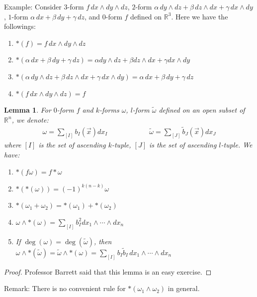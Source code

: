 \documentclass[15pt]{book}
\theoremstyle{break}
\theoremstyle{break}
\newtheorem{lem}{Lemma}[thm]
\newcommand{\R}{\mathbb{R}}
\newcommand{\that}[1]{\widetilde{#1}}
\newcommand{\remark}{\color{blue}Remark: \color{black}}
\newcommand{\example}{\color{green}Example: \color{black}}
\begin{document}
\example
Consider $3$-form $f\, dx\wedge dy \wedge dz$, $2$-form $\alpha\, dy \wedge dz + \beta\, dz \wedge dx + \gamma\, dx \wedge dy$, $1$-form $\alpha \, dx + \beta \, dy + \gamma \, dz$, and $0$-form $f$ defined on $\R^3$. Here we have the followings:
\begin{enumerate}[topsep=3pt,itemsep=-1ex,partopsep=1ex,parsep=1ex]
\item $*(f) = f\, dx \wedge dy \wedge dz$ 
\item $*(\alpha \, dx + \beta \, dy + \gamma \, dz) = \alpha dy \wedge dz + \beta dz \wedge dx + \gamma dx \wedge dy$
\item $*(\alpha\, dy \wedge dz + \beta\, dz \wedge dx + \gamma\, dx \wedge dy) = \alpha\, dx + \beta \, dy + \gamma \, dz$
\item $*(f\, dx\wedge dy \wedge dz) = f$
\end{enumerate}


\begin{lem}
For $0$-form $f$ and $k$-forms $\omega$, $l$-form $\that{\omega}$ defined on an open subset of $\R^n$, we denote:
\begin{align*}
\omega = \sum_{[I]} b_I(\vec{x}) dx_I \qquad\qquad\qquad\that{\omega} =\sum_{[J]} \that{b}_J(\vec{x}) dx_J
\end{align*}
where $[I]$ is the set of ascending $k$-tuple, $[J]$ is the set of ascending $l$-tuple. We have: 
\begin{enumerate}[topsep=3pt,itemsep=-1ex,partopsep=1ex,parsep=1ex]
\item $*(f\omega) = f*\omega$
\item $*(*(\omega)) = (-1)^{k(n-k)}\omega$
\item $*(\omega_1 + \omega_2) = *(\omega_1) + *(\omega_2)$
\item $\omega\wedge *(\omega) = \sum_{[I]}b_I^2 dx_1 \wedge \cdots\wedge dx_n$
\item If $\deg(\omega) = \deg(\that{\omega})$, then $\omega \wedge *(\that{\omega}) = \that{\omega}\wedge *(\omega) = \sum_{[I]} b_I \that{b}_I \, dx_1 \wedge \cdots \wedge dx_n$
\end{enumerate}
\end{lem}
\begin{proof}
Professor Barrett said that this lemma is an easy exercise.
\end{proof}

\remark There is no convenient rule for $*(\omega_1 \wedge \omega_2)$ in general.\\
\end{document}

